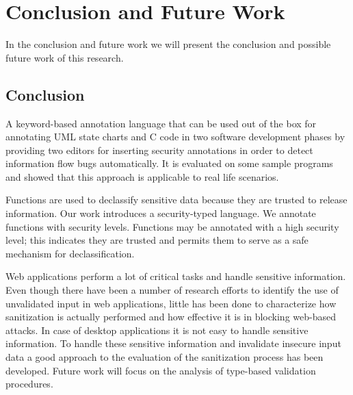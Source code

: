 \chapter{Conclusion and Future Work}

In the conclusion and future work we will present the conclusion and possible future work of this research.

\section{Conclusion}
A keyword-based annotation language that can be used out of the box for annotating UML state charts and C code in two software development phases by providing two editors for inserting security annotations in order to detect information flow bugs automatically. It is evaluated on some sample programs and showed that this approach is applicable to real life scenarios.

Functions are used to declassify sensitive data because they are trusted to release information. Our work introduces a security-typed language. We annotate functions with security levels. Functions may be annotated with a high security level; this indicates they are trusted and permits them to serve as a safe mechanism for declassification.

Web applications perform a lot of critical tasks and
handle sensitive information. Even though there have been
a number of research efforts to identify the use of unvalidated input in web applications, little has been done
to characterize how sanitization is actually performed and
how effective it is in blocking web-based attacks. In case of desktop applications it is not easy to handle sensitive information. To handle these sensitive information and invalidate insecure input data a good approach to the evaluation of the sanitization process has been developed. Future work will focus on the analysis of type-based validation procedures.

